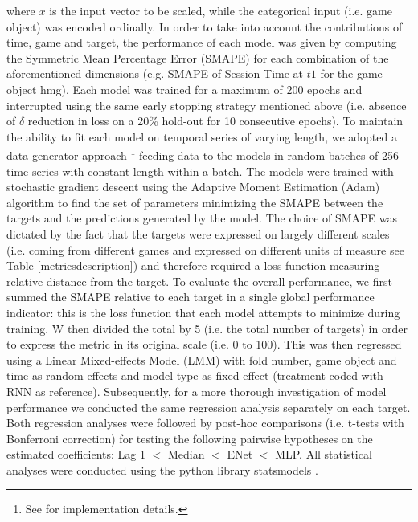 where $x$ is the input vector to be scaled, while the categorical input (i.e. game object) was encoded ordinally. In order to take into account the contributions of time, game and target, the performance of each model was given by computing the Symmetric Mean Percentage Error (SMAPE) \cite{zhu2017deep} for each combination of the aforementioned dimensions (e.g. SMAPE of Session Time at $t1$ for the game object hmg). Each model was trained for a maximum of 200 epochs and interrupted using the same early stopping strategy mentioned above (i.e. absence of $\delta$ reduction in loss on a 20\% hold-out for 10 consecutive epochs). To maintain the ability to fit each model on temporal series of varying length, we adopted a data generator approach \footnote{See \cite{chollet2015keras,tensorflow2015-whitepaper} for implementation details.} feeding data to the models in random batches of 256 time series with constant length within a batch. The models were trained with stochastic gradient descent using the Adaptive Moment Estimation (Adam) \cite{kingma2014adam} algorithm to find the set of parameters minimizing the SMAPE between the targets and the predictions generated by the model. The choice of SMAPE was dictated by the fact that the targets were expressed on largely different scales (i.e. coming from different games and expressed on different units of measure see Table \ref{metricsdescription}) and therefore required a loss function measuring relative distance from the target. To evaluate the overall performance, we first summed the SMAPE relative to each target in a single global performance indicator: this is the loss function that each model attempts to minimize during training. W then divided the total by 5 (i.e. the total number of targets) in order to express the metric in its original scale (i.e. 0 to 100). This was then regressed using a Linear Mixed-effects Model (LMM) with fold number, game object and time as random effects and model type as fixed effect (treatment coded with RNN as reference). Subsequently, for a more thorough investigation of model performance we conducted the same regression analysis separately on each target. Both regression analyses were followed by post-hoc comparisons (i.e. t-tests with Bonferroni correction) for testing the following pairwise hypotheses on the estimated coefficients: Lag 1 $<$ Median $<$ ENet $<$ MLP. All statistical analyses were conducted using the python library statsmodels \cite{seabold2010statsmodels}. 

